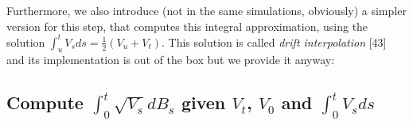 \documentclass[12pt,oneside]{reedthesis}
\theoremstyle{definition}
\theoremstyle{definition}
\theoremstyle{remark}
\begin{document}
  \footnotesize
  \begin{Shaded}
  \begin{Highlighting}[]
  \StringTok{ }\OperatorTok{-}
  \StringTok{ }
  \StringTok{ }
  \StringTok{ }\OperatorTok{-}\StringTok{ }
      \OperatorTok{==}\StringTok{ }\OperatorTok{-}\NormalTok{)}
  \StringTok{ }\OperatorTok{-}\NormalTok{)}
      \OperatorTok{==}\StringTok{ }\NormalTok{)}
  \StringTok{ }
      \NormalTok{(}
                      \NormalTok{)}\OperatorTok{$}
  \NormalTok{  \}}
  \StringTok{ }\OperatorTok{::}
  \end{Highlighting}
  \end{Shaded}
  \normalsize
  
  Furthermore, we also introduce (not in the same simulations, obviously)
  a simpler version for this step, that computes this integral
  approximation, using the solution
  \(\int_{u}^{t}{V_s ds} = \frac{1}{2} \left( V_u + V_t \right)\). This
  solution is called \emph{drift interpolation} {[}43{]} and its
  implementation is out of the box but we provide it anyway:
  \begin{Shaded}
  \begin{Highlighting}[]
  \StringTok{ }\OperatorTok{*}\StringTok{ }\NormalTok{((}\OperatorTok{/}\NormalTok{) }\OperatorTok{*}\StringTok{ }\OperatorTok{+}\StringTok{ }\NormalTok{(}\OperatorTok{/}\NormalTok{) }\OperatorTok{*}\StringTok{ }
  \end{Highlighting}
  \end{Shaded}
  \subsection{\texorpdfstring{Compute \(\int_0^t \sqrt{V_s}dB_s\) given
  \(V_t\), \(V_0\) and
  \(\int_0^t V_sds\)}{Compute \textbackslash{}int\_0\^{}t \textbackslash{}sqrt\{V\_s\}dB\_s given V\_t, V\_0 and \textbackslash{}int\_0\^{}t V\_sds}}\label{compute-int_0t-sqrtv_sdb_s-given-v_t-v_0-and-int_0t-v_sds}
  
\end{document}
